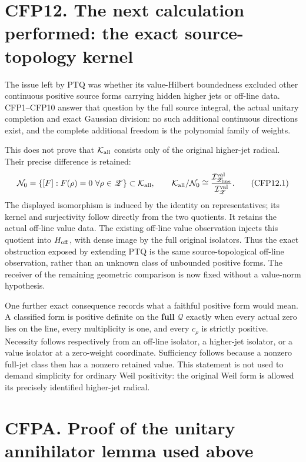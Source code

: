 \section{CFP12. The next calculation performed: the exact
source-topology
kernel}\label{cfp12.-the-next-calculation-performed-the-exact-source-topology-kernel}

The issue left by PTQ was whether its value-Hilbert boundedness excluded
other continuous positive source forms carrying hidden higher jets or
off-line data. CFP1--CFP10 answer that question by the full source
integral, the actual unitary completion and exact Gaussian division: no
such additional continuous directions exist, and the complete additional
freedom is the polynomial family of weights.

This does not prove that \(\mathcal K_{\rm all}\) consists only of the
original higher-jet radical. Their precise difference is retained: \[
\mathcal N_0=\{[F]:F(\rho)=0\ \forall\rho\in\mathscr Z\}
\subset\mathcal K_{\rm all},
\qquad
\mathcal K_{\rm all}/\mathcal N_0
\cong\frac{\mathcal I_{\mathscr Z_{\rm line}}^{\rm val}}
{\mathcal I_{\mathscr Z}^{\rm val}}.
\tag{CFP12.1}
\] The displayed isomorphism is induced by the identity on
representatives; its kernel and surjectivity follow directly from the
two quotients. It retains the actual off-line value data. The existing
off-line value observation injects this quotient into \(H_{\rm off}\),
with dense image by the full original isolators. Thus the exact
obstruction exposed by extending PTQ is the same source-topological
off-line observation, rather than an unknown class of unbounded positive
forms. The receiver of the remaining geometric comparison is now fixed
without a value-norm hypothesis.

One further exact consequence records what a faithful positive form
would mean. A classified form is positive definite on the \textbf{full}
\(\mathcal Q\) exactly when every actual zero lies on the line, every
multiplicity is one, and every \(c_\rho\) is strictly positive.
Necessity follows respectively from an off-line isolator, a higher-jet
isolator, or a value isolator at a zero-weight coordinate. Sufficiency
follows because a nonzero full-jet class then has a nonzero retained
value. This statement is not used to demand simplicity for ordinary Weil
positivity: the original Weil form is allowed its precisely identified
higher-jet radical.

\section{CFPA. Proof of the unitary annihilator lemma used
above}\label{cfpa.-proof-of-the-unitary-annihilator-lemma-used-above}

